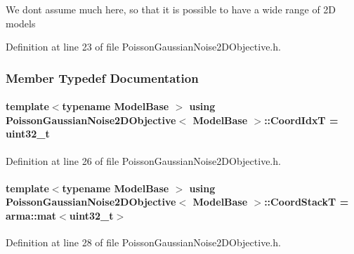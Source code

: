 We don\textquotesingle{}t assume much here, so that it is possible to have a wide range of 2D models 

Definition at line 23 of file Poisson\+Gaussian\+Noise2\+D\+Objective.\+h.



\subsubsection{Member Typedef Documentation}
\paragraph[{\texorpdfstring{Coord\+IdxT}{CoordIdxT}}]{\setlength{\rightskip}{0pt plus 5cm}template$<$typename Model\+Base $>$ using {\bf Poisson\+Gaussian\+Noise2\+D\+Objective}$<$ Model\+Base $>$\+::{\bf Coord\+IdxT} =  uint32\+\_\+t}\hypertarget{classPoissonGaussianNoise2DObjective_a4167a20571c56d874f26f7432e5e3232}{}\label{classPoissonGaussianNoise2DObjective_a4167a20571c56d874f26f7432e5e3232}


Definition at line 26 of file Poisson\+Gaussian\+Noise2\+D\+Objective.\+h.

\paragraph[{\texorpdfstring{Coord\+StackT}{CoordStackT}}]{\setlength{\rightskip}{0pt plus 5cm}template$<$typename Model\+Base $>$ using {\bf Poisson\+Gaussian\+Noise2\+D\+Objective}$<$ Model\+Base $>$\+::{\bf Coord\+StackT} =  arma\+::mat$<$uint32\+\_\+t$>$}\hypertarget{classPoissonGaussianNoise2DObjective_a5842f130c58c7f50fe2e44a76f6981a9}{}\label{classPoissonGaussianNoise2DObjective_a5842f130c58c7f50fe2e44a76f6981a9}


Definition at line 28 of file Poisson\+Gaussian\+Noise2\+D\+Objective.\+h.

